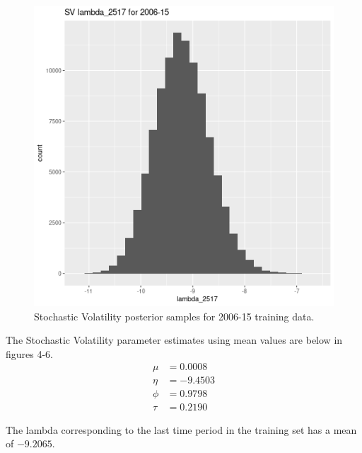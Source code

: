 \documentclass[12pt,letterpaper,reqno,fleqn]{article}
\begin{document}
\begin{figure}
\includegraphics[scale = .4]{svlT0615}
\caption{Stochastic Volatility posterior samples for 2006-15 training data.}
\end{figure}

The Stochastic Volatility parameter estimates using mean values are below in figures 4-6.
\begin{align*}
\mu &= 0.0008 \\
\eta &= -9.4503 \\
\phi &= 0.9798 \\
\tau &= 0.2190 
\end{align*}

The lambda corresponding to the last time period in the training set has a mean of $-9.2065$.
\end{document}
